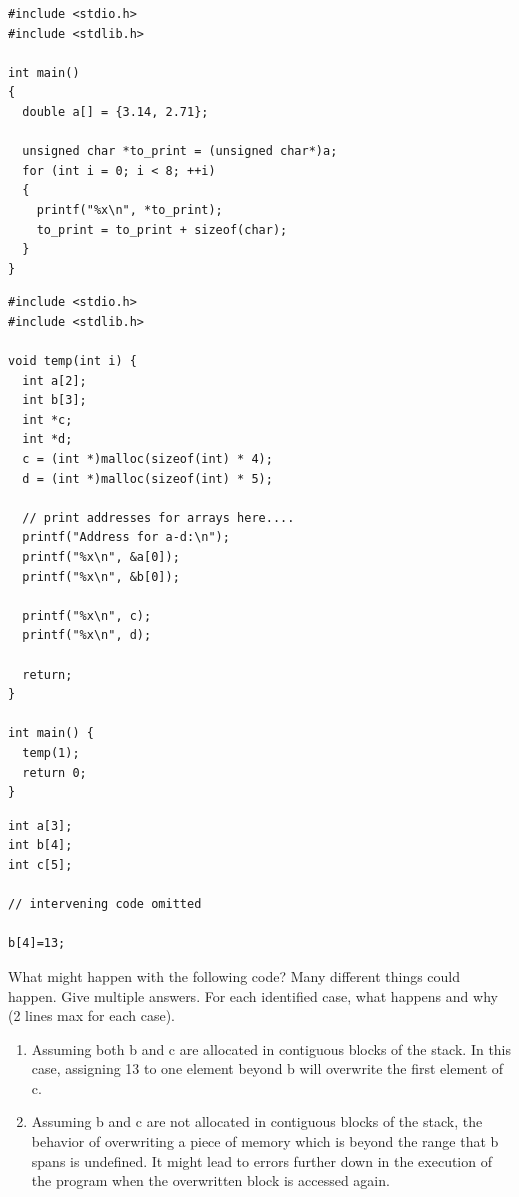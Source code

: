 \documentclass[
  course = {{ESE532 System-on-a-Chip}},
  quartile = {{}},
  assignment = 1,
  name = {{Sheil Sarda}},
  studentnumber = {{}},
  email = {{sheils@seas.upenn.edu}},
  firstexercise = 1
]{aga-homework}
\begin{document}
\subexercise
\begin{verbatim}
#include <stdio.h>
#include <stdlib.h>

int main()
{
  double a[] = {3.14, 2.71};

  unsigned char *to_print = (unsigned char*)a;
  for (int i = 0; i < 8; ++i)
  {	
    printf("%x\n", *to_print);
    to_print = to_print + sizeof(char);
  }
}
\end{verbatim}

\subexercise
\begin{verbatim}
#include <stdio.h>
#include <stdlib.h>

void temp(int i) {
  int a[2];
  int b[3];
  int *c;
  int *d;
  c = (int *)malloc(sizeof(int) * 4);
  d = (int *)malloc(sizeof(int) * 5);

  // print addresses for arrays here....
  printf("Address for a-d:\n");
  printf("%x\n", &a[0]);
  printf("%x\n", &b[0]);

  printf("%x\n", c);
  printf("%x\n", d);

  return;
}

int main() {
  temp(1);
  return 0;
}
\end{verbatim}

\subexercise
\begin{verbatim}
int a[3];
int b[4];
int c[5];

// intervening code omitted

b[4]=13;
\end{verbatim}
What might happen with the following code? Many different things could happen. Give multiple answers. For each identified case, what happens and why (2 lines max for each case).

\renewcommand{\theenumi}{Case \Roman{enumi}}%
\begin{enumerate}
	\item Assuming both b and c are allocated in contiguous blocks of the stack. In this case, assigning 13 to one element beyond b will overwrite the first element of c. 
	\item Assuming b and c are not allocated in contiguous blocks of the stack, the behavior of overwriting a piece of memory which is beyond the range that b spans is undefined. It might lead to errors further down in the execution of the program when the overwritten block is accessed again.
\end{enumerate}
\end{document}
